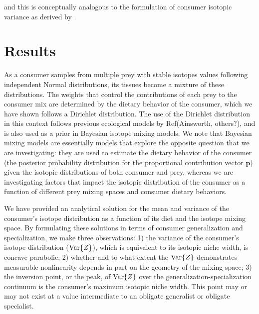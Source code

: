 \documentclass{frontiersSCNS}
\begin{document}
\noindent and this is conceptually analogous to the formulation of consumer isotopic variance as derived by \citet{Fink:2012eg}.





\section{Results}

As a consumer samples from multiple prey with stable isotopes values following independent Normal distributions, its tissues become a mixture of these distributions.
The weights that control the contributions of each prey to the consumer mix are determined by the dietary behavior of the consumer, which we have shown follows a Dirichlet distribution.
The use of the Dirichlet distribution in this context follows previous ecological models by Ref(Ainsworth, others?), and is also used as a prior in Bayesian isotope mixing models.
We note that Bayesian mixing models are essentially models that explore the opposite question that we are investigating: they are used to estimate the dietary behavior of the consumer (the posterior probability distribution for the proportional contribution vector $\bm p$) given the isotopic distributions of both consumer and prey, whereas we are investigating factors that impact the isotopic distribution of the consumer as a function of different prey mixing spaces and consumer dietary behaviors.


We have provided an analytical solution for the mean and variance of the consumer's isotope distribution as a function of its diet and the isotope mixing space.
By formulating these solutions in terms of consumer generalization and specialization, we make three observations:
1) the variance of the consumer's isotope distribution (${\rm Var}\{Z\}$), which is equivalent to its isotopic niche width, is concave parabolic;
2) whether and to what extent the ${\rm Var}\{Z\}$ demonstrates measurable nonlinearity depends in part on the geometry of the mixing space;
3) the inversion point, or the peak, of ${\rm Var}\{Z\}$ over the generalization-specialization continuum is the consumer's maximum isotopic niche width.
This point may or may not exist at a value intermediate to an obligate generalist or obligate specialist.
\end{document}

